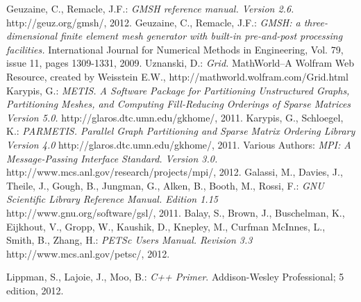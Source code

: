 \begin{thebibliography}{}
Geuzaine, C., Remacle, J.F.: \textit{GMSH reference manual. Version 2.6.} http://geuz.org/gmsh/, 2012.
Geuzaine, C., Remacle, J.F.: \textit{GMSH: a three-dimensional finite element mesh generator with built-in pre-and-post processing facilities.} International Journal for Numerical Methods in Engineering, Vol. 79, issue 11, pages 1309-1331, 2009.
Uznanski, D.: \textit{Grid.} MathWorld--A Wolfram Web Resource, created by Weisstein E.W., http://mathworld.wolfram.com/Grid.html
Karypis, G.: \textit{METIS. A Software Package for Partitioning Unstructured Graphs, Partitioning Meshes, and Computing Fill-Reducing Orderings of Sparse Matrices Version 5.0.} http://glaros.dtc.umn.edu/gkhome/, 2011.
Karypis, G., Schloegel, K.: \textit{PARMETIS. Parallel Graph Partitioning and Sparse Matrix Ordering Library Version 4.0} http://glaros.dtc.umn.edu/gkhome/, 2011.
Various Authors: \textit{MPI: A Message-Passing Interface Standard. Version 3.0.} http://www.mcs.anl.gov/research/projects/mpi/, 2012.
Galassi, M., Davies, J., Theile, J., Gough, B., Jungman, G., Alken, B., Booth, M., Rossi, F.: \textit{GNU Scientific Library Reference Manual. Edition 1.15} http://www.gnu.org/software/gsl/, 2011.
Balay, S., Brown, J., Buschelman, K.,  Eijkhout, V., Gropp, W., Kaushik, D., Knepley, M., Curfman McInnes, L., Smith, B., Zhang, H.: \textit{PETSc Users Manual. Revision 3.3} http://www.mcs.anl.gov/petsc/, 2012.

Lippman, S., Lajoie, J., Moo, B.: \textit{C++ Primer}. Addison-Wesley Professional; 5 edition, 2012.

\end{thebibliography}
